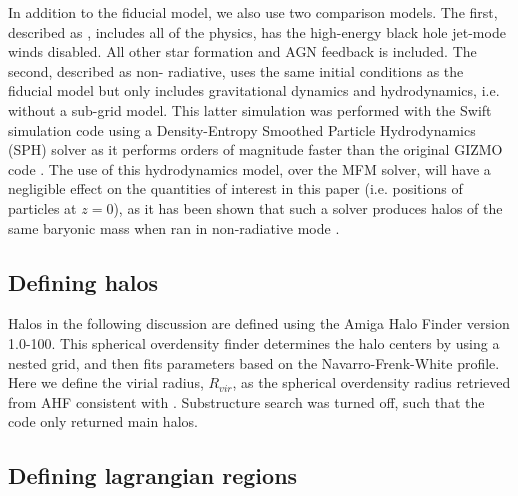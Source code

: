 In addition to the fiducial model, we also use two comparison models. The first, described as \nojet{}, includes all of the \simba{} physics, has the high-energy black hole jet-mode winds disabled.  All other star formation and AGN feedback is included.  The second, described as non-
radiative, uses the same initial conditions as the fiducial model but only
includes gravitational dynamics and hydrodynamics, i.e. without a sub-grid
model. This latter simulation was performed with the {\sc Swift} simulation
code \citep{Schaller2016} using a Density-Entropy Smoothed Particle
Hydrodynamics (SPH) solver as it performs orders of magnitude faster than the
original GIZMO code \citep{Borrow2018}. The use of this hydrodynamics model,
over the MFM solver, will have a negligible effect on the quantities of
interest in this paper (i.e. positions of particles at $z=0$), as it has been
shown that such a solver produces halos of the same baryonic mass when ran in
non-radiative mode \citep[see e.g.][]{Sembolini2016}.


\subsection{Defining halos}

Halos in the following discussion are defined using the Amiga Halo Finder
\citep[AHF, ][]{Gill2004, Knollmann2009} version 1.0-100. This spherical
overdensity finder determines the halo centers by using a nested grid, and
then fits parameters based on the Navarro-Frenk-White \citep[NFW,
][]{Navarro1995} profile. Here we define the virial radius, $R_{vir}$, as the
spherical overdensity radius retrieved from AHF consistent with
\citet{Lacey1994}. Substructure search was turned off, such that the code
only returned main halos.

\subsection{Defining lagrangian regions}

